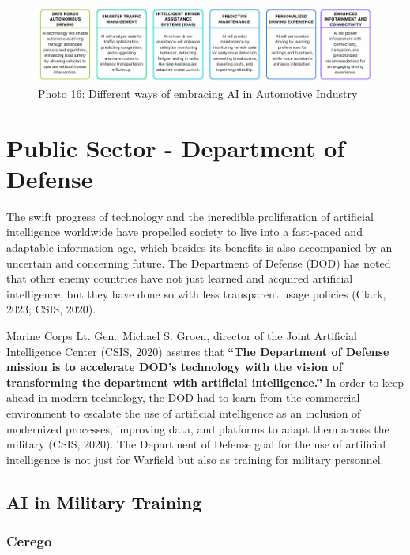 \documentclass[
]{article}
\begin{document}
\begin{figure}
\centering
\includegraphics{Canva.png}
\caption{Photo 16: Different ways of embracing AI in Automotive Industry}
\end{figure}

\hypertarget{public-sector---department-of-defense}{%
\section{Public Sector - Department of Defense}\label{public-sector---department-of-defense}}

The swift progress of technology and the incredible proliferation of artificial intelligence worldwide have propelled society to live into a fast-paced and adaptable information age, which besides its benefits is also accompanied by an uncertain and concerning future. The Department of Defense (DOD) has noted that other enemy countries have not just learned and acquired artificial intelligence, but they have done so with less transparent usage policies (Clark, 2023; CSIS, 2020).

Marine Corps Lt. Gen.~Michael S. Groen, director of the Joint Artificial Intelligence Center (CSIS, 2020) assures that \textbf{``The Department of Defense mission is to accelerate DOD's technology with the vision of transforming the department with artificial intelligence.''} In order to keep ahead in modern technology, the DOD had to learn from the commercial environment to escalate the use of artificial intelligence as an inclusion of modernized processes, improving data, and platforms to adapt them across the military (CSIS, 2020). The Department of Defense goal for the use of artificial intelligence is not just for Warfield but also as training for military personnel.

\hypertarget{ai-in-military-training}{%
\subsection{AI in Military Training}\label{ai-in-military-training}}

\hypertarget{cerego}{%
\subsubsection{Cerego}\label{cerego}}
\end{document}
